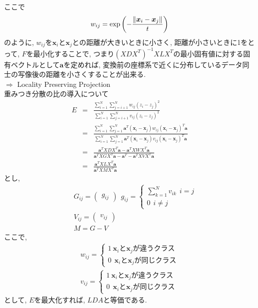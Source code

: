 \documentclass[dvipdfmx,a4j]{jsarticle}
\begin{document}
ここで
\begin{eqnarray*}
    w_{ij}={\rm exp}\left(-\frac{\|\bm{x}_{i}-\bm{x}_{j}\|}{t}\right)
\end{eqnarray*}
のように, $w_{ij}$を$\bm{x}_{i}$と$\bm{x}_{j}$との距離が大きいときに小さく, 距離が小さいときに1をとって, $F$を最小化することで, つまり$(XDX^{T})^{-1}XLX^{T}$の最小固有値に対する固有ベクトルとして$\bm{a}$を定めれば, 変換前の座標系で近くに分布しているデータ同士の写像後の距離を小さくすることが出来る.\\
$\Rightarrow$ Locality Preserving Projection\\[1cm]
重みつき分散の比の導入について
\begin{eqnarray*}
    E&=&\frac{\displaystyle \sum_{i=1}^{N}\sum_{j=i+1}^{N}w_{ij}(z_{i}-z_{j})^{2}}{\displaystyle \sum_{i=1}^{N}\sum_{j=i+1}^{N}v_{ij}(z_{i}-z_{j})^{2}}\\
     &=&\frac{\displaystyle \sum_{i=1}^{N}\sum_{j=1}^{N}\bm{a}^{T}(\bm{x}_{i}-\bm{x}_{j})w_{ij}(\bm{x}_{i}-\bm{x}_{j})^{T}\bm{a}}{\displaystyle \sum_{i=1}^{N}\sum_{j=1}^{N}\bm{a}^{T}(\bm{x}_{i}-\bm{x}_{j})v_{ij}(\bm{x}_{i}-\bm{x}_{j})^{T}\bm{a}}\\
     &=&\frac{\bm{a}^{T}XDX^{T}\bm{a}-\bm{a}^{T}XWX^{T}\bm{a}}{\bm{a}^{T}XGX^{T}\bm{a}-\bm{a}^{T}-\bm{a}^{T}XVX^{T}\bm{a}}\\
     &=&\frac{\bm{a}^{T}XLX^{T}\bm{a}}{\bm{a}^{T}XMX^{T}\bm{a}}
\end{eqnarray*}
とし,
\begin{eqnarray*}
    &&G_{ij}=\begin{pmatrix}g_{ij}\end{pmatrix}\ \ g_{ij}=\left\{ \begin{array}{l} \displaystyle \sum_{k=1}^{N}v_{ik}\ \ i=j\\ 0\ \ i\neq j \end{array} \right.\\
    &&V_{ij}=\begin{pmatrix}v_{ij}\end{pmatrix}\\
    &&M=G-V
\end{eqnarray*}
ここで,
\begin{eqnarray*}
    w_{ij}=\left\{ \begin{array}{l} 1 \ \bm{x}_{i}と\bm{x}_{j}が違うクラス\\ 0\ \ \bm{x}_{i}と\bm{x}_{j}が同じクラス\end{array} \right.\\
    v_{ij}=\left\{ \begin{array}{l} 1 \ \bm{x}_{i}と\bm{x}_{j}が違うクラス\\ 0\ \ \bm{x}_{i}と\bm{x}_{j}が同じクラス\end{array} \right.
\end{eqnarray*}
として, $E$を最大化すれば, $LDA$と等価である.
\end{document}

